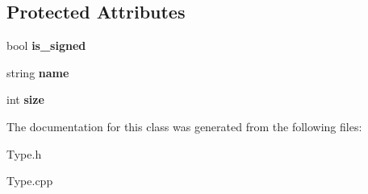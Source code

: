 \subsection*{Protected Attributes}
\begin{DoxyCompactItemize}
\item 
\hypertarget{classPODType_a70fc6860646131aa3bad5800257522b5}{bool {\bfseries is\-\_\-signed}}\label{classPODType_a70fc6860646131aa3bad5800257522b5}

\item 
\hypertarget{classType_ad7eeefba3dfcecbdaa98d46aaa84e389}{string {\bfseries name}}\label{classType_ad7eeefba3dfcecbdaa98d46aaa84e389}

\item 
\hypertarget{classType_a871302dc63ac1a37c0b6a225cf82048d}{int {\bfseries size}}\label{classType_a871302dc63ac1a37c0b6a225cf82048d}

\end{DoxyCompactItemize}


The documentation for this class was generated from the following files\-:\begin{DoxyCompactItemize}
\item 
Type.\-h\item 
Type.\-cpp\end{DoxyCompactItemize}
